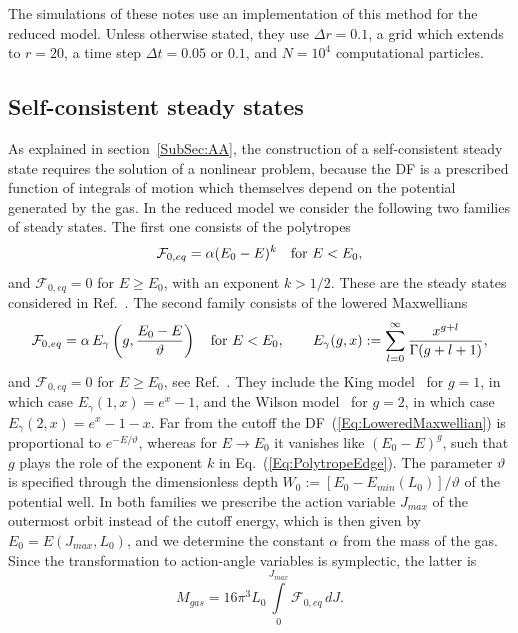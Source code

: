 The simulations of these notes use an implementation of this method for the reduced model. Unless otherwise stated, they use $\Delta r = 0.1$, a grid which extends to $r = 20$, a time step $\Delta t = 0.05$ or $0.1$, and $N = 10^4$ computational particles. 


\subsection{Self-consistent steady states}
\label{SubSec:SteadyStatesNum}

As explained in section~\ref{SubSec:AA}, the construction of a self-consistent steady state requires the solution of a nonlinear problem, because the DF is a prescribed function of integrals of motion which themselves depend on the potential generated by the gas. In the reduced model we consider the following two families of steady states. The first one consists of the polytropes
\begin{equation}
\mathcal{F}_{0,eq} = \alpha (E_0 - E)^k\quad \hbox{for $E < E_0$},
\label{Eq:Polytrope}
\end{equation}
and $\mathcal{F}_{0,eq} = 0$ for $E\geq E_0$, with an exponent $k > 1/2$. These are the steady states considered in Ref.~\cite{mHgRmScS25}. The second family consists of the lowered Maxwellians
\begin{equation}
\mathcal{F}_{0,eq} = \alpha\, E_\gamma\left( g,\frac{E_0 - E}{\vartheta} \right)\quad \hbox{for $E < E_0$},\qquad
E_\gamma(g,x) := \sum\limits_{l=0}^\infty \frac{x^{g+l}}{\Gamma(g+l+1)},
\label{Eq:LoweredMaxwellian}
\end{equation}
and $\mathcal{F}_{0,eq} = 0$ for $E\geq E_0$, see Ref.~\cite{mGaZ15}. They include the King model~\cite{iK66} for $g = 1$, in which case $E_\gamma(1,x) = e^x - 1$, and the Wilson model~\cite{cW75} for $g = 2$, in which case $E_\gamma(2,x) = e^x - 1 - x$. Far from the cutoff the DF~(\ref{Eq:LoweredMaxwellian}) is proportional to $e^{-E/\vartheta}$, whereas for $E\to E_0$ it vanishes like $(E_0 - E)^g$, such that $g$ plays the role of the exponent $k$ in Eq.~(\ref{Eq:PolytropeEdge}). The parameter $\vartheta$ is specified through the dimensionless depth $W_0 := [E_0 - E_{min}(L_0)]/\vartheta$ of the potential well. In both families we prescribe the action variable $J_{max}$ of the outermost orbit instead of the cutoff energy, which is then given by $E_0 = E(J_{max},L_0)$, and we determine the constant $\alpha$ from the mass of the gas. Since the transformation to action-angle variables is symplectic, the latter is
\begin{equation}
M_{gas} = 16\pi^3 L_0\int\limits_0^{J_{max}} \mathcal{F}_{0,eq}\, dJ.
\label{Eq:MgasJ}
\end{equation}

